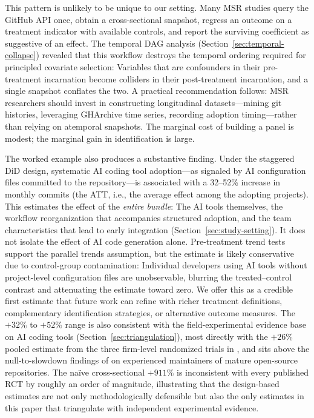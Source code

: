 This pattern is unlikely to be unique to our setting.
Many MSR studies query the GitHub API once, obtain a cross-sectional snapshot, regress an outcome on a treatment indicator with available controls, and report the surviving coefficient as suggestive of an effect.
The temporal DAG analysis (Section~\ref{sec:temporal-collapse}) revealed that this workflow destroys the temporal ordering required for principled covariate selection: Variables that are confounders in their pre-treatment incarnation become colliders in their post-treatment incarnation, and a single snapshot conflates the two.
A practical recommendation follows: MSR researchers should invest in constructing longitudinal datasets---mining git histories, leveraging GHArchive time series, recording adoption timing---rather than relying on atemporal snapshots.
The marginal cost of building a panel is modest; the marginal gain in identification is large.

The worked example also produces a substantive finding.
Under the staggered DiD design, systematic AI coding tool adoption---as signaled by AI configuration files committed to the repository---is associated with a 32--52\% increase in monthly commits (the ATT, i.e., the average effect among the adopting projects).
This estimates the effect of the \emph{entire bundle}: The AI tools themselves, the workflow reorganization that accompanies structured adoption, and the team characteristics that lead to early integration (Section~\ref{sec:study-setting}).
It does not isolate the effect of AI code generation alone.
Pre-treatment trend tests support the parallel trends assumption, but the estimate is likely conservative due to control-group contamination: Individual developers using AI tools without project-level configuration files are unobservable, blurring the treated--control contrast and attenuating the estimate toward zero.
We offer this as a credible first estimate that future work can refine with richer treatment definitions, complementary identification strategies, or alternative outcome measures.
The $+32\%$ to $+52\%$ range is also consistent with the field-experimental evidence base on AI coding tools (Section~\ref{sec:triangulation}), most directly with the $+26\%$ pooled estimate from the three firm-level randomized trials in \citet{cui2025effects}, and sits above the null-to-slowdown findings of \citet{becker2025measuring} on experienced maintainers of mature open-source repositories.
The na\"ive cross-sectional $+911\%$ is inconsistent with every published RCT by roughly an order of magnitude, illustrating that the design-based estimates are not only methodologically defensible but also the only estimates in this paper that triangulate with independent experimental evidence.

